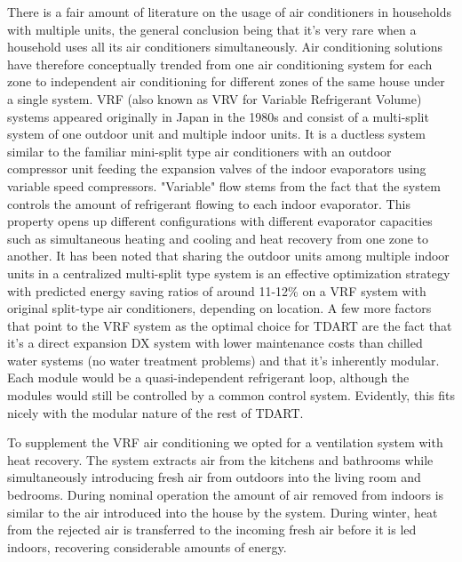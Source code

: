 \documentclass[justified]{tufte-book}
\begin{document}
	There is a fair amount of literature\cite{jian2011study, ran2011wu, li2014testing}  on the usage of air conditioners in households  with multiple units, the general conclusion being that it's very rare when a household uses all its air conditioners simultaneously.
	Air conditioning solutions have therefore conceptually trended from one air conditioning system for each zone to independent air conditioning for different zones of the same house under a single system\cite{park2001performance}. VRF (also known as VRV for Variable Refrigerant Volume) systems appeared originally in Japan in the 1980s and consist of a multi-split system of one outdoor unit and multiple indoor units. It is a ductless system similar to the familiar mini-split type air conditioners with an outdoor compressor unit feeding the expansion valves of the indoor evaporators using variable speed compressors. "Variable" flow stems from the fact that the system controls the amount of refrigerant flowing to each indoor evaporator. This property opens up different configurations with different evaporator capacities such as simultaneous heating and cooling and heat recovery from one zone to another\cite{goetzler2007variable}.
	It has been noted that sharing the outdoor units among multiple indoor units in a centralized multi-split type system is an effective optimization strategy\cite{li2017simulation} with predicted energy saving ratios of around 11-12\% on a VRF system with original split-type air conditioners, depending on location. A few more factors that point to the VRF system as the optimal choice for TDART are the fact that it's a direct expansion DX system with lower maintenance costs than chilled water systems (no water treatment problems) and that it's inherently modular. Each module would be a quasi-independent refrigerant loop, although the modules would still be controlled by a common control system. Evidently, this fits nicely with the modular nature of the rest of TDART.
\par To supplement the VRF air conditioning we opted for a ventilation system with heat recovery. The system extracts air from the kitchens and bathrooms while simultaneously introducing fresh air from outdoors into the living room and bedrooms. During nominal operation the amount of air removed from indoors is similar to the air introduced into the house by the system. During winter, heat from the rejected air is transferred to the incoming fresh air before it is led indoors, recovering considerable amounts of energy.
\par 
\end{document}
